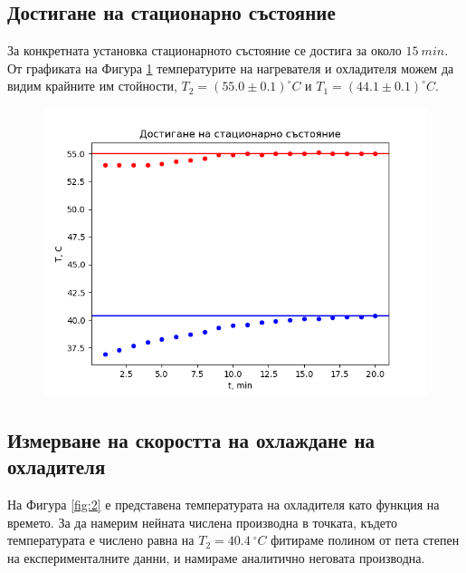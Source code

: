 \documentclass[reprint,amsmath,amssymb,aps]{revtex4-2}
\newcommand{\degree}{^{\circ}}
\begin{document}
\subsection{Достигане на стационарно състояние}

За конкретната установка стационарното състояние се достига за около $15 \ \si{min}$. От графиката на Фигура \ref{fig:1} температурите на нагревателя и охладителя можем да видим крайните им стойности, $T_2 = (55.0 \pm 0.1) \degree C$ и $T_1 = (44.1 \pm 0.1) \degree C$. 

\begin{figure}[H] 
    \centering
    \includegraphics[width=\columnwidth, keepaspectratio=true]{graph_statz.png}
    \caption{}
    \label{fig:1}
\end{figure}

\subsection{Измерване на скоростта на охлаждане на охладителя}

На Фигура \ref{fig:2} е представена температурата на охладителя като функция на времето. За да намерим нейната числена производна в точката, където температурата е числено равна на $T_2 = 40.4 \ \degree C$ фитираме полином от пета степен на експерименталните данни, и намираме аналитично неговата производна.  
\end{document}
